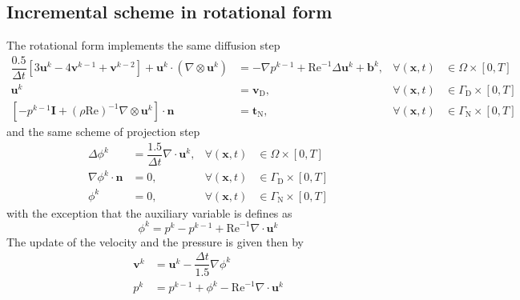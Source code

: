 \documentclass[]{scrartcl}
\begin{document}
\subsection{Incremental scheme in rotational form}
The rotational form implements the same diffusion step
\begin{equation*}
	\begin{aligned}
		\dfrac{0.5}{\Delta t} \left[3\mathbf{u}^{k} - 4\mathbf{v}^{k-1} + \mathbf{v}^{k-2}\right]  + \mathbf{u}^{k} \cdot (\nabla \otimes \mathbf{u}^{k}) &= -\nabla p^{k-1} +  \mathrm{Re}^{-1} \Delta \mathbf{u}^{k} + \mathbf{b}^{k}, &\forall (\mathbf{x}, t) &\in \Omega \times \left[0, T \right]  \\
		\mathbf{u}^{k} &= \mathbf{v}_\textrm{D}, &\forall (\mathbf{x}, t) &\in \Gamma_\textrm{D} \times \left[0, T \right] \\
		[-p^{k-1} \mathbf{I} + (\rho\textrm{Re})^{-1}\nabla \otimes \mathbf{u}^{k}]\cdot \mathbf{n} &= \mathbf{t}_\textrm{N}, &\forall \left(\mathbf{x}, t\right) &\in \Gamma_\textrm{N} \times \left[0, T \right]
	\end{aligned}
\end{equation*}
and the same scheme of projection step
\begin{equation*}
	\begin{aligned}
		\Delta \phi^{k} &= \dfrac{1.5}{\Delta t} \nabla \cdot \mathbf{u}^{k},  &\forall (\mathbf{x}, t) &\in \Omega \times \left[0, T \right] \\
		\nabla \phi^{k} \cdot \mathbf{n} &= 0, &\forall (\mathbf{x}, t) &\in \Gamma_\textrm{D} \times \left[0, T \right] \\
		\phi^{k} &= 0, &\forall\left(\mathbf{x}, t\right) &\in \Gamma_\textrm{N} \times \left[0, T \right]
	\end{aligned}
\end{equation*}
with the exception that the auxiliary variable is defines as
\begin{equation*}
	\phi^{k} = p^{k} - p^{k-1} + \textrm{Re}^{-1} \nabla \cdot \mathbf{u}^{k}
\end{equation*}
The update of the velocity and the pressure is given then by
\begin{equation*}
	\begin{aligned}
		\mathbf{v}^{k} &= \mathbf{u}^{k} - \dfrac{\Delta t}{1.5} \nabla \phi^{k} \\
		p^{k} &= p^{k-1} + \phi^{k} -  \textrm{Re}^{-1} \nabla \cdot \mathbf{u}^{k}
	\end{aligned}
\end{equation*}
\end{document}
